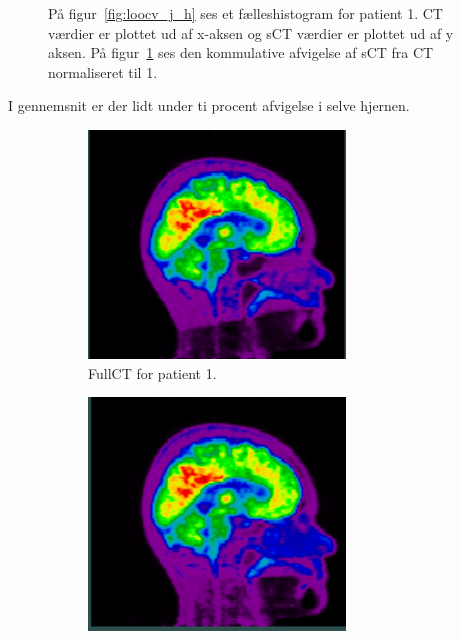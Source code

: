 \begin{figure}
\begin{subfigure}[b]{0.47\textwidth}
        \label{fig:cumm_diff_loocv}
    \end{subfigure}
    \caption{På figur~\ref{fig:loocv_j_h} ses et fælleshistogram for patient 1. CT værdier er plottet ud af x-aksen og sCT værdier er plottet ud af y aksen. På figur~\ref{fig:cumm_diff_loocv} ses den kommulative afvigelse af sCT fra CT normaliseret til 1.}
    \label{fig:loocv}
\end{figure}

I gennemsnit er der lidt under ti procent afvigelse i selve hjernen.

\begin{figure}
    \centering
    \begin{subfigure}{0.3\textwidth}
        \centering
        \includegraphics[width=0.75\textwidth]{colager/loocv_pet/loocv_010476_pet_ct.png}
        \caption{FullCT for patient 1.}
        \label{col:loocv_pet_pat1_ct}
    \end{subfigure}\hfill
    \begin{subfigure}{0.3\textwidth}
        \centering
        \includegraphics[width=0.75\textwidth]{colager/loocv_pet/loocv_010476_pet_sct.png}

\end{subfigure}
\end{figure}
